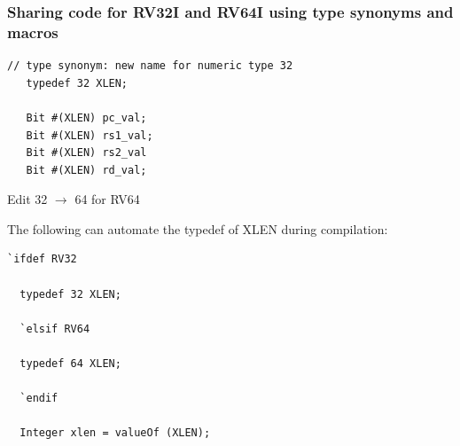 \begin{frame}[fragile]
\frametitle{Sharing code for RV32I and RV64I using type synonyms and macros}

\footnotesize

\begin{center}
 \begin{minipage}{0.5\textwidth}
  \begin{Verbatim}[frame=single]
   // type synonym: new name for numeric type 32
   typedef 32 XLEN;

   Bit #(XLEN) pc_val;
   Bit #(XLEN) rs1_val;
   Bit #(XLEN) rs2_val
   Bit #(XLEN) rd_val;
  \end{Verbatim}

  \vspace{1ex}

  Edit 32 $\rightarrow$ 64 for RV64
 \end{minipage}
 \hmmm
 \begin{minipage}{0.35\textwidth}
  The following can automate the typedef of XLEN during compilation:

  \vspace{2ex}

  \begin{Verbatim}[frame=single, label=in src\_Common/Arch.bsv]
  `ifdef RV32

  typedef 32 XLEN;

  `elsif RV64

  typedef 64 XLEN;

  `endif

  Integer xlen = valueOf (XLEN);
  \end{Verbatim}
 \end{minipage}
\end{center}

\end{frame}


